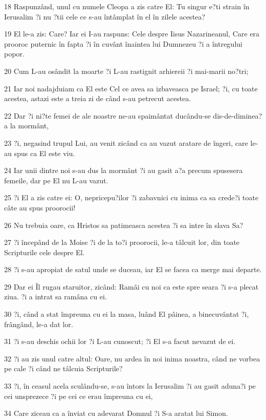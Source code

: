 \par 18 Raspunzând, unul cu numele Cleopa a zis catre El: Tu singur e?ti strain în Ierusalim ?i nu ?tii cele ce s-au întâmplat în el în zilele acestea?
\par 19 El le-a zis: Care? Iar ei I-au raspuns: Cele despre Iisus Nazarineanul, Care era prooroc puternic în fapta ?i în cuvânt înaintea lui Dumnezeu ?i a întregului popor.
\par 20 Cum L-au osândit la moarte ?i L-au rastignit arhiereii ?i mai-marii no?tri;
\par 21 Iar noi nadajduiam ca El este Cel ce avea sa izbaveasca pe Israel; ?i, cu toate acestea, astazi este a treia zi de când s-au petrecut acestea.
\par 22 Dar ?i ni?te femei de ale noastre ne-au spaimântat ducându-se dis-de-diminea?a la mormânt,
\par 23 ?i, negasind trupul Lui, au venit zicând ca au vazut aratare de îngeri, care le-au spus ca El este viu.
\par 24 Iar unii dintre noi s-au dus la mormânt ?i au gasit a?a precum spusesera femeile, dar pe El nu L-au vazut.
\par 25 ?i El a zis catre ei: O, nepricepu?ilor ?i zabavnici cu inima ca sa crede?i toate câte au spus proorocii!
\par 26 Nu trebuia oare, ca Hristos sa patimeasca acestea ?i sa intre în slava Sa?
\par 27 ?i începând de la Moise ?i de la to?i proorocii, le-a tâlcuit lor, din toate Scripturile cele despre El.
\par 28 ?i s-au apropiat de satul unde se duceau, iar El se facea ca merge mai departe.
\par 29 Dar ei Îl rugau staruitor, zicând: Ramâi cu noi ca este spre seara ?i s-a plecat ziua. ?i a intrat sa ramâna cu ei.
\par 30 ?i, când a stat împreuna cu ei la masa, luând El pâinea, a binecuvântat ?i, frângând, le-a dat lor.
\par 31 ?i s-au deschis ochii lor ?i L-au cunoscut; ?i El s-a facut nevazut de ei.
\par 32 ?i au zis unul catre altul: Oare, nu ardea în noi inima noastra, când ne vorbea pe cale ?i când ne tâlcuia Scripturile?
\par 33 ?i, în ceasul acela sculându-se, s-au întors la Ierusalim ?i au gasit aduna?i pe cei unsprezece ?i pe cei ce erau împreuna cu ei,
\par 34 Care ziceau ca a înviat cu adevarat Domnul ?i S-a aratat lui Simon.
